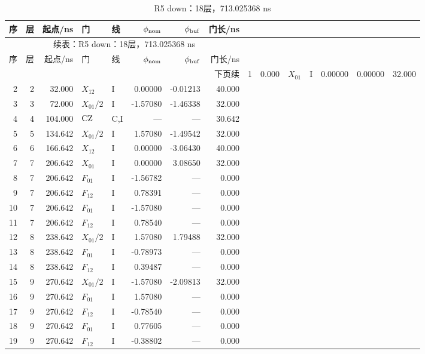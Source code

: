 {\small\setlength{\tabcolsep}{4pt}\fontsize{9}{10.6}\selectfont\renewcommand{\arraystretch}{1.0}
\begin{longtable}{@{}rrrllrrr@{}}
\caption{R5 down：18层，713.025368 ns}\label{tab:r5down}\\\toprule
序 & 层 & 起点/ns & 门 & 线 & $\phi_{\rm nom}$ & $\phi_{\rm buf}$ & 门长/ns\\\midrule\endfirsthead
\multicolumn{8}{c}{续表：R5 down：18层，713.025368 ns}\\\toprule
序 & 层 & 起点/ns & 门 & 线 & $\phi_{\rm nom}$ & $\phi_{\rm buf}$ & 门长/ns\\\midrule\endhead
\midrule\multicolumn{8}{r}{下页续}\endfoot
\bottomrule\endlastfoot
1 & 1 & 0.000 & $X_{01}$ & I & 0.00000 & 0.00000 & 32.000\\
2 & 2 & 32.000 & $X_{12}$ & I & 0.00000 & -0.01213 & 40.000\\
3 & 3 & 72.000 & $X_{01}/2$ & I & -1.57080 & -1.46338 & 32.000\\
4 & 4 & 104.000 & $\mathrm{CZ}$ & C,I & --- & --- & 30.642\\
5 & 5 & 134.642 & $X_{01}/2$ & I & 1.57080 & -1.49542 & 32.000\\
6 & 6 & 166.642 & $X_{12}$ & I & 0.00000 & -3.06430 & 40.000\\
7 & 7 & 206.642 & $X_{01}$ & I & 0.00000 & 3.08650 & 32.000\\
8 & 7 & 206.642 & $F_{01}$ & I & -1.56782 & --- & 0.000\\
9 & 7 & 206.642 & $F_{12}$ & I & 0.78391 & --- & 0.000\\
10 & 7 & 206.642 & $F_{01}$ & I & -1.57080 & --- & 0.000\\
11 & 7 & 206.642 & $F_{12}$ & I & 0.78540 & --- & 0.000\\
12 & 8 & 238.642 & $X_{01}/2$ & I & 1.57080 & 1.79488 & 32.000\\
13 & 8 & 238.642 & $F_{01}$ & I & -0.78973 & --- & 0.000\\
14 & 8 & 238.642 & $F_{12}$ & I & 0.39487 & --- & 0.000\\
15 & 9 & 270.642 & $X_{01}/2$ & I & -1.57080 & -2.09813 & 32.000\\
16 & 9 & 270.642 & $F_{01}$ & I & 1.57080 & --- & 0.000\\
17 & 9 & 270.642 & $F_{12}$ & I & -0.78540 & --- & 0.000\\
18 & 9 & 270.642 & $F_{01}$ & I & 0.77605 & --- & 0.000\\
19 & 9 & 270.642 & $F_{12}$ & I & -0.38802 & --- & 0.000\\

\end{longtable}}
